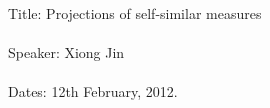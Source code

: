 \documentclass{article}
\numberwithin{equation}{section}
\begin{document}
{\large
Title: Projections of self-similar measures
\\ \\
Speaker: Xiong Jin
\\ \\
Dates: 12th February, 2012.}
\\ \\
\begin{abstract}
We give a variant on the proof of Hochman and Shmerkin's theorem on projections of self-similar measures. This enables us to generalise their results to self-similar measures without any separation conditions. This is joint work with Kenneth Falconer.
\end{abstract}
\end{document}
